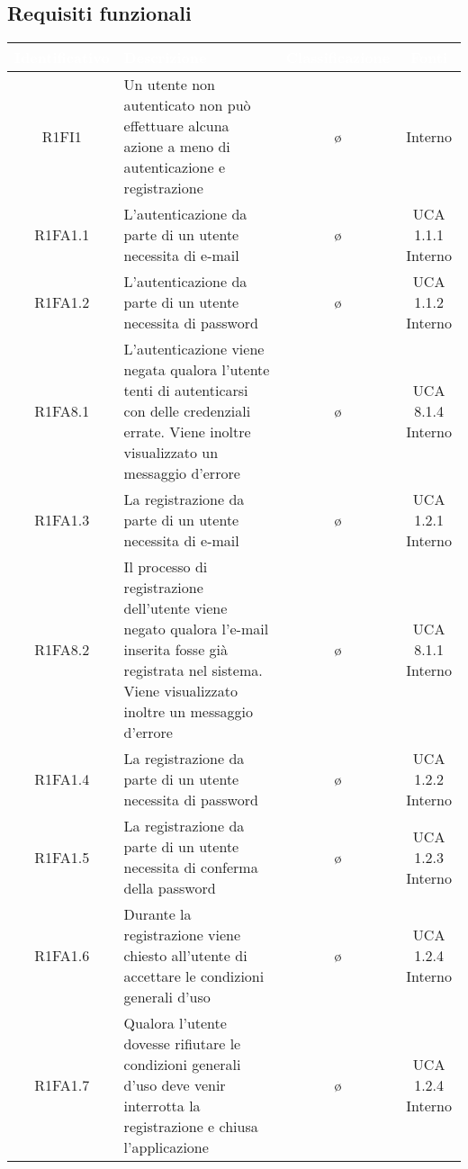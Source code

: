 \subsection{Requisiti funzionali}
{
\renewcommand{\arraystretch}{1.5}
\centering
\begin{longtable}{ c C{8cm} c c}
\textcolor{white}{\textbf{Identificativo}} & \textcolor{white}{\textbf{Descrizione}} & \textcolor{white}{\textbf{Classificazione}} & \textcolor{white}{\textbf{Fonti}}\\	
\endhead

R1FI1 & Un utente non autenticato non può effettuare alcuna azione a meno di autenticazione e registrazione & \o & Interno\\

R1FA1.1 & L'autenticazione da parte di un utente necessita di e-mail & \o & UCA 1.1.1 Interno\\

R1FA1.2 & L'autenticazione da parte di un utente necessita di password & \o & UCA 1.1.2 Interno\\

R1FA8.1 & L'autenticazione viene negata qualora l'utente tenti di autenticarsi con delle credenziali errate. Viene inoltre visualizzato un messaggio d'errore & \o & UCA 8.1.4 Interno\\

R1FA1.3 & La registrazione da parte di un utente necessita di e-mail & \o & UCA 1.2.1 Interno\\

R1FA8.2 & Il processo di registrazione dell'utente viene negato qualora l'e-mail inserita fosse già registrata nel sistema. Viene visualizzato inoltre un messaggio d'errore & \o & UCA 8.1.1 Interno\\

R1FA1.4 & La registrazione da parte di un utente necessita di password & \o & UCA 1.2.2 Interno\\

R1FA1.5 & La registrazione da parte di un utente necessita di conferma della password & \o & UCA 1.2.3 Interno\\

R1FA1.6 & Durante la registrazione viene chiesto all'utente di accettare le condizioni generali d'uso & \o & UCA 1.2.4 Interno\\

R1FA1.7 & Qualora l'utente dovesse rifiutare le condizioni generali d'uso deve venir interrotta la registrazione e chiusa l'applicazione & \o & UCA 1.2.4 Interno\\


\end{longtable}}
